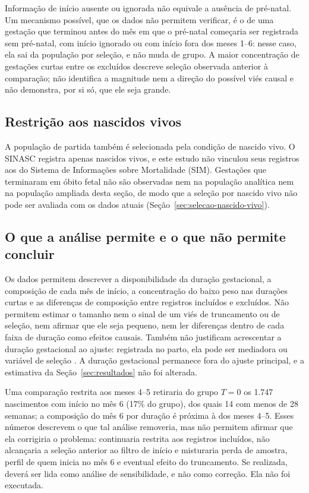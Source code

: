 \documentclass[11pt,a4paper]{article}
\begin{document}
Informação de início ausente ou ignorada não equivale a ausência de pré-natal. Um
mecanismo possível, que os dados não permitem verificar, é o de uma gestação que terminou
antes do mês em que o pré-natal começaria ser registrada sem pré-natal, com início ignorado
ou com início fora dos meses 1--6: nesse caso, ela sai da população por seleção, e não muda
de grupo. A maior concentração de gestações curtas entre os excluídos descreve seleção
observada anterior à comparação; não identifica a magnitude nem a direção do possível viés
causal e não demonstra, por si só, que ele seja grande.

\subsection{Restrição aos nascidos vivos}

A população de partida também é selecionada pela condição de nascido vivo. O SINASC
registra apenas nascidos vivos, e este estudo não vinculou seus registros aos do Sistema
de Informações sobre Mortalidade (SIM). Gestações que terminaram em óbito fetal não são
observadas nem na população analítica nem na população ampliada desta seção, de modo que
a seleção por nascido vivo não pode ser avaliada com os dados atuais
(Seção~\ref{sec:selecao-nascido-vivo}).

\subsection{O que a análise permite e o que não permite concluir}

Os dados permitem descrever a disponibilidade da duração gestacional, a composição de cada
mês de início, a concentração do baixo peso nas durações curtas e as diferenças de
composição entre registros incluídos e excluídos. Não permitem estimar o tamanho nem o
sinal de um viés de truncamento ou de seleção, nem afirmar que ele seja pequeno, nem ler
diferenças dentro de cada faixa de duração como efeitos causais. Também não justificam
acrescentar a duração gestacional ao ajuste: registrada no parto, ela pode ser mediadora
ou variável de seleção \cite{wilcox2011,schisterman2009}. A duração gestacional permanece
fora do ajuste principal, e a estimativa da Seção~\ref{sec:resultados} não foi alterada.

Uma comparação restrita aos meses 4--5 retiraria do grupo $T=0$ os 1.747 nascimentos com
início no mês 6 (17\% do grupo), dos quais 14 com menos de 28 semanas; a composição do mês
6 por duração é próxima à dos meses 4--5. Esses números descrevem o que tal análise
removeria, mas não permitem afirmar que ela corrigiria o problema: continuaria restrita aos
registros incluídos, não alcançaria a seleção anterior ao filtro de início e misturaria
perda de amostra, perfil de quem inicia no mês 6 e eventual efeito do truncamento. Se
realizada, deverá ser lida como análise de sensibilidade, e não como correção. Ela não foi
executada.
\end{document}
